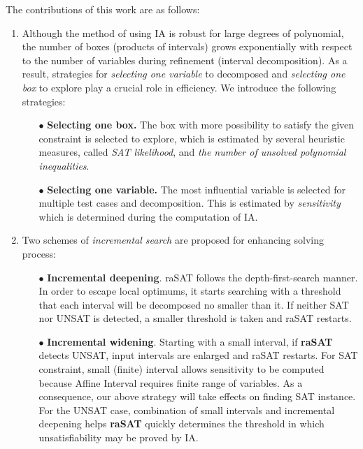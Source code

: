 The contributions of this work are as follows:
\begin{enumerate}
\item Although the method of using IA is robust for large degrees of polynomial, the number of boxes (products of intervals) grows exponentially with respect to the number of variables during refinement (interval decomposition). As a result, strategies for \emph{selecting one variable} to decomposed and \emph{selecting one box} to explore play a crucial role in efficiency. We introduce the following strategies:
\begin{itemize}
\item[$\bullet$] \textbf{Selecting one box.} The box with more possibility to satisfy the given constraint is selected to explore, which is estimated by 
several heuristic measures, called {\em SAT likelihood}, 
and \emph{the number of unsolved polynomial inequalities}.
\item[$\bullet$] \textbf{Selecting one variable.} The most influential variable is selected for multiple test cases and decomposition. 
This is estimated by {\em sensitivity} which is determined during the computation of IA.
\end{itemize}
\item Two schemes of \emph{incremental search} are proposed for enhancing solving process: 
\begin{itemize} 
\item[$\bullet$] {\bf Incremental deepening}. 
raSAT follows the depth-first-search manner. In order to escape local optimums, it starts searching with a threshold that each interval will be decomposed no smaller than it. 
If neither SAT nor UNSAT is detected, a smaller threshold is taken and raSAT restarts. 
\item[$\bullet$] {\bf Incremental widening}. 
Starting with a small interval, if \textbf{raSAT} detects UNSAT, input intervals are enlarged
and raSAT restarts. For SAT constraint, small (finite) interval allows sensitivity to be computed because Affine Interval \cite{VanKhanh201227} requires finite range of variables. As a consequence, our above strategy will take effects on finding SAT instance. For the UNSAT case, combination of small intervals and incremental deepening helps \textbf{raSAT} quickly determines the threshold in which unsatisfiability may be proved by IA. 
\end{itemize} 
\begin{comment}
SAT-likelihood is introduced to measure the possibility of an inequality to be satisfiable. Sensitivity is proposed to estimate the influence of a variable to the value of a polynomial.

\end{comment}
\end{enumerate}
